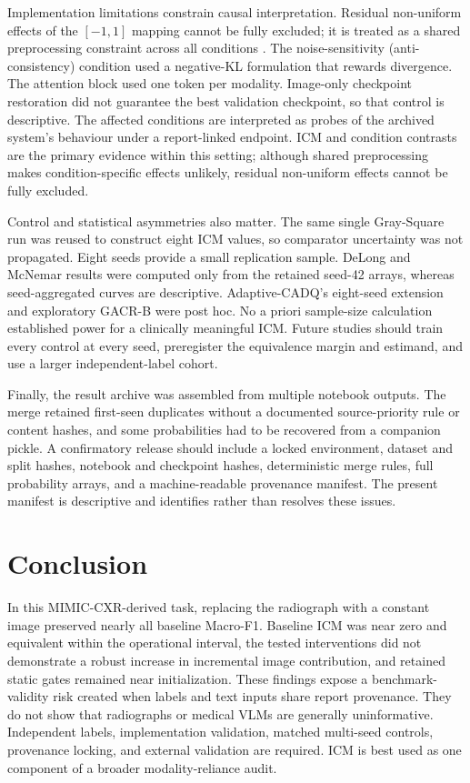 \documentclass[a4paper,fleqn]{cas-sc}
\begin{document}
Implementation limitations constrain causal interpretation. Residual
non-uniform effects of the $[-1,1]$ mapping cannot be fully excluded; it is
treated as a shared preprocessing constraint across all conditions
\cite{cohen2022torchxrayvision}. The noise-sensitivity (anti-consistency) condition
used a negative-KL formulation that rewards divergence. The attention block
used one token per modality. Image-only checkpoint restoration did not
guarantee the best validation checkpoint, so that control is descriptive.
The affected conditions are interpreted as probes of the archived system's
behaviour under a report-linked endpoint. ICM and condition contrasts are the
primary evidence within this setting; although shared preprocessing makes
condition-specific effects unlikely, residual non-uniform effects cannot be
fully excluded.

Control and statistical asymmetries also matter. The same single Gray-Square
run was reused to construct eight ICM values, so comparator uncertainty was not
propagated. Eight seeds provide a small replication sample. DeLong and McNemar
results were computed only from the retained seed-42 arrays, whereas
seed-aggregated curves are descriptive. Adaptive-CADQ's eight-seed extension and
exploratory GACR-B were post hoc. No a priori sample-size calculation established power for
a clinically meaningful ICM. Future studies should train every control at every
seed, preregister the equivalence margin and estimand, and use a larger
independent-label cohort.

Finally, the result archive was assembled from multiple notebook outputs. The
merge retained first-seen duplicates without a documented source-priority rule
or content hashes, and some probabilities had to be recovered from a companion
pickle. A confirmatory release should include a locked environment, dataset and
split hashes, notebook and checkpoint hashes, deterministic merge rules, full
probability arrays, and a machine-readable provenance manifest. The present
manifest is descriptive and identifies rather than resolves these issues.

\section{Conclusion}\label{sec:conclusion}

In this MIMIC-CXR-derived task, replacing the radiograph with a constant image
preserved nearly all baseline Macro-F1. Baseline ICM was near zero and equivalent
within the operational interval, the tested interventions did not demonstrate a
robust increase in incremental image contribution, and retained static gates
remained near initialization. These findings expose a benchmark-validity risk
created when labels and text inputs share report provenance. They do not show
that radiographs or medical VLMs are generally uninformative. Independent
labels, implementation validation, matched multi-seed controls, provenance
locking, and external validation are required. ICM is best used as one component
of a broader modality-reliance audit.
\end{document}
